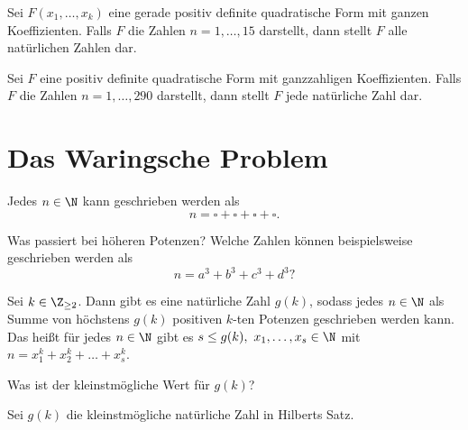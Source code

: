 \begin{thm*}
	Sei $F(x_1,\dotsc,x_k)$ eine gerade positiv definite quadratische Form mit ganzen Koeffizienten. Falls $F$ die Zahlen $n = 1,\dotsc, 15$ darstellt, dann stellt $F$ alle natürlichen Zahlen dar.
\end{thm*}

\begin{thm*}
	Sei $F$ eine positiv definite quadratische Form mit ganzzahligen Koeffizienten. Falls $F$ die Zahlen $n=1, \dotsc, 290$ darstellt, dann stellt $F$ jede natürliche Zahl dar.
\end{thm*}

\section{Das Waringsche Problem}

\begin{thm*}[Jacobi]
	Jedes $n \in \N$ kann geschrieben werden als 
	\[ n = \square + \square + \square + \square. \]
\end{thm*}

\begin{frage*}
	Was passiert bei höheren Potenzen? Welche Zahlen können beispielsweise geschrieben werden als
	\[ n = a^3+b^3+c^3+d^3? \]
\end{frage*}

\begin{thm*}
	Sei $k \in \Z_{\geq 2}$. Dann gibt es eine natürliche Zahl $g(k)$, sodass jedes $n \in \N$ als Summe von höchstens $g(k)$ positiven $k$-ten Potenzen geschrieben werden kann. Das heißt für jedes $n \in \N$ gibt es $s \leq g(k),\ x_1,\dotsc,x_s \in \N$ mit $n = x_1^k + x_2^k + \dotsc + x_s^k$.
\end{thm*}

\begin{frage*}
	Was ist der kleinstmögliche Wert für $g(k)$?
\end{frage*}

\begin{defn*}
	Sei $g(k)$ die kleinstmögliche natürliche Zahl in Hilberts Satz.
\end{defn*}


